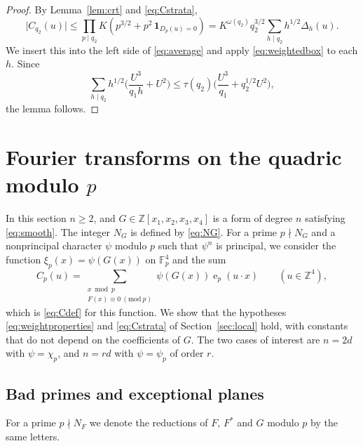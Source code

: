 \documentclass[11pt]{amsart}
\numberwithin{equation}{section}
\numberwithin{figure}{section}
\theoremstyle{definition}
\newcommand{\Z}{\mathbb{Z}}
\newcommand{\F}{\mathcal{F}}
\newcommand{\e}{\operatorname{e}}
\newcommand{\imod}[1]{\ (\mathrm{mod}\ #1)}
\newcommand{\abs}[1]{\lvert #1\rvert}
\newcommand{\Fp}{\mathbb F_p}
\begin{document}
\begin{proof}
By Lemma~\ref{lem:crt} and \eqref{eq:Cstrata},
\begin{equation}\label{eq:Cexpand}
 \abs{C_{q_2}(u)}\le\prod_{p\mid q_2}K(p^{3/2}+p^2\,\mathbf 1_{D_p(u)=0})
 =K^{\omega(q_2)}q_2^{3/2}\sum_{h\mid q_2}h^{1/2}\Delta_h(u).
\end{equation}
We insert this into the left side of \eqref{eq:average} and apply
\eqref{eq:weightedbox} to each $h$. Since
\[
 \sum_{h\mid q_2}h^{1/2}\Big(\frac{U^3}{q_1h}+U^2\Big)
 \le\tau(q_2)\Big(\frac{U^3}{q_1}+q_2^{1/2}U^2\Big),
\]
the lemma follows.
\end{proof}

\section{Fourier transforms on the quadric modulo \texorpdfstring{$p$}{p}}\label{sec:fourier}

In this section $n\ge2$, and $G\in\Z[x_1,x_2,x_3,x_4]$ is a form of
degree $n$ satisfying \eqref{eq:smooth}. The integer $N_G$ is defined
by \eqref{eq:NG}. For a prime $p\nmid N_G$ and a nonprincipal
character $\psi$ modulo $p$ such that $\psi^n$ is principal, we
consider the function $\xi_p(x)=\psi(G(x))$ on $\Fp^4$ and the sum
\begin{equation}\label{eq:Cpsi}
 C_p(u)=\sum_{\substack{x\bmod p\\F(x)\equiv0\imod p}}\psi(G(x))\e_p(u\cdot x)
 \qquad(u\in\Z^4),
\end{equation}
which is \eqref{eq:Cdef} for this function. We show that the
hypotheses \eqref{eq:weightproperties} and \eqref{eq:Cstrata} of
Section~\ref{sec:local} hold, with constants that do not depend on
the coefficients of $G$. The two cases of interest are $n=2d$ with
$\psi=\chi_p$, and $n=rd$ with $\psi=\psi_p$ of order $r$.

\subsection{Bad primes and exceptional planes}\label{sec:cover}

For a prime $p\nmid N_F$ we denote the reductions of $F$, $F^*$ and
$G$ modulo $p$ by the same letters.
\end{document}
